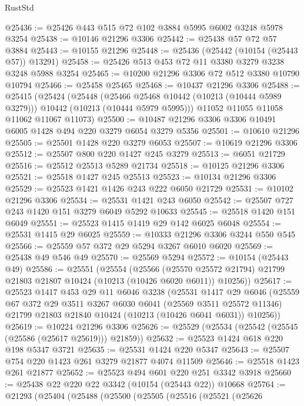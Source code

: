 \begin{lexlean}{RustStd}
\begin{coremodule}
{\begin{coremodule}
{{{{{{{{{{{{{{{{{{{{{{{{{{@25436 := @25426 @443 @515 @72 @102 @3884 @5995 @6002 @3248 @5978 @3254
@25438 := @10146 @21296 @3306
@25442 := @25438 @57 @72 @57 @3884
@25443 := @10155 @21296
@25448 := @25436 (@25442 (@10154 (@25443 @57)) @13291)
@25458 := @25426 @513 @453 @72 @11 @3380 @3279 @3238 @3248 @5988 @3254
@25465 := @10200 @21296 @3306 @72 @512 @3380 @10790 @10794
@25466 := @25458 @25465
@25468 := @10437 @21296 @3306
@25488 := @25415
    (@25424
      (@25448
        (@25466 @25468 @10442 (@10213 (@10444 @5989 @3279)))
        @10442
        (@10213 (@10444 @5979 @5995)))
      @11052
      @11055
      @11058
      @11062
      @11067
      @11073)
@25500 := @10487 @21296 @3306 @3306 @10491 @6005 @1428 @494 @220 @3279 @6054 @3279 @5356
@25501 := @10610 @21296
@25505 := @25501 @1428 @220 @3279 @6053
@25507 := @10619 @21296 @3306
@25512 := @25507 @800 @220 @1427 @245 @3279
@25513 := @6051 @21729
@25516 := @25512 @25513 @5289 @21734
@25518 := @10125 @21296 @3306
@25521 := @25518 @1427 @245 @25513
@25523 := @10134 @21296 @3306
@25529 := @25523 @1421 @1426 @243 @222 @6050 @21729
@25531 := @10102 @21296 @3306
@25534 := @25531 @1421 @243 @6050
@25542 := @25507 @727 @243 @1420 @151 @3279 @6049 @5292 @10633
@25545 := @25518 @1420 @151 @6049
@25551 := @25523 @1415 @1419 @29 @142 @6025 @6048
@25554 := @25531 @1415 @29 @6025
@25559 := @10333 @21296 @3306 @3244 @550 @545
@25566 := @25559 @57 @372 @29 @5294 @3267 @6010 @6020
@25569 := @25438 @49 @546 @49
@25570 := @25569 @5294
@25572 := @10154 (@25443 @49)
@25586 := @25551
    (@25554
      (@25566
        (@25570 @25572 @21794)
        @21799
        @21803
        @21807
        @10424
        (@10213 (@10426 @6020 @6011))
        @10256))
@25617 := @25523
    @1417
    @453
    @29
    @11
    @6046
    @3238
    (@25531
      @1417
      @29
      @6046
      (@25559
        @67
        @372
        @29
        @3511
        @3267
        @6030
        @6041
        (@25569 @3511 @25572 @11346)
        @21799
        @21803
        @21840
        @10424
        (@10213 (@10426 @6041 @6031))
        @10256))
@25619 := @10224 @21296 @3306
@25626 := @25529 (@25534 (@25542 (@25545 (@25586 (@25617 @25619))) @21859))
@25632 := @25523 @1424 @618 @220 @198 @5347 @3721
@25635 := @25531 @1424 @220 @5347
@25643 := @25507 @754 @220 @1423 @261 @3279 @21877 @4074 @11509
@25646 := @25518 @1423 @261 @21877
@25652 := @25523 @494 @601 @220 @251 @3342 @3918
@25660 := @25438 @22 @220 @22 @3342 (@10154 (@25443 @22)) @10668
@25764 := @21293
    (@25404
      (@25488
        (@25500
          (@25505
            (@25516
              (@25521
                (@25626
}}}}}}}}}}}}}}}}}}}}}}}}}}
\end{coremodule}}
\end{coremodule}
\end{lexlean}
